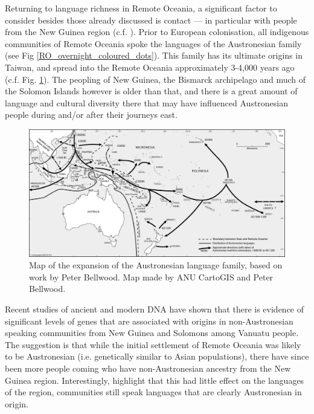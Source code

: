 \documentclass[12pt,letterpaper]{article}
\begin{document}
Returning to language richness in Remote Oceania, a significant factor to consider besides those already discussed is contact --- in particular with people from the New Guinea region (c.f. \citet{ross2017_new_guinea_region}). Prior to European colonisation, all indigenous communities of Remote Oceania spoke the languages of the Austronesian family (see Fig \ref{RO_overnight_coloured_dots}). This family has its ultimate origins in Taiwan, and spread into the Remote Oceania approximately 3-4,000 years ago (c.f. Fig. \ref{austro_expansion_bellwood}). The peopling of New Guinea, the Bismarck archipelago and much of the Solomon Islands however is older than that, and there is a great amount of language and cultural diversity there that may have influenced Austronesian people during and/or after their journeys east. 

\begin{figure}[ht]
\centering
\includegraphics[width=15cm]{ANU_cartography.jpg}
\caption{Map of the expansion of the Austronesian language family, based on work by Peter Bellwood. Map made by ANU CartoGIS and Peter Bellwood.}
\label{austro_expansion_bellwood}
\end{figure}

Recent studies of ancient and modern DNA \citep{lipson_harvad_ancient_dna_vanuatu_2018, posth_jena_ancient_dna_vanuatu_2018} have shown that there is evidence of significant levels of genes that are associated with origins in non-Austronesian speaking communities from New Guinea and Solomons among Vanuatu people. The suggestion is that while the initial settlement of Remote Oceania was likely to be Austronesian (i.e. genetically similar to Asian populations), there have since been more people coming who have non-Austronesian ancestry from the New Guinea region. Interestingly, \citet{posth_jena_ancient_dna_vanuatu_2018} highlight that this had little effect on the languages of the region, communities still speak languages that are clearly Austronesian in origin.
\end{document}
